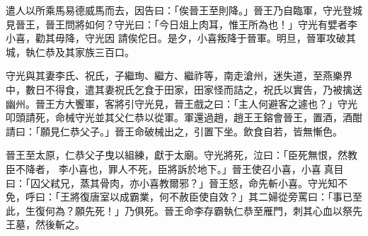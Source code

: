 \begin{pinyinscope}
 遣人以所乘馬易德威馬而去，因告曰：「俟晉王至則降。」晉王乃自臨軍，守光登城見晉王，晉王問將如何？守光曰：「今日俎上肉耳，惟王所為也！」守光有嬖者李小喜，勸其毋降，守光因
 請俟佗日。是夕，小喜叛降于晉軍。明旦，晉軍攻破其城，執仁恭及其家族三百口。



 守光與其妻李氏、祝氏，子繼珣、繼方、繼祚等，南走滄州，迷失道，至燕樂界中，數日不得食，遣其妻祝氏乞食于田家，田家怪而詰之，祝氏以實告，乃被擒送幽州。晉王方大饗軍，客將引守光見，晉王戲之曰：「主人何避客之遽也？」守光叩頭請死，命械守光並其父仁恭以從軍。軍還過趙，趙王王鎔會晉王，置酒，酒酣請曰：「願見仁恭父子。」晉王命破械出之，引置下坐。飲食自若，皆無慚色。



 晉王至太原，仁恭父子曳以組練，獻于太廟。守光將死，泣曰：「臣死無恨，然教臣不降者，
 李小喜也，罪人不死，臣將訴於地下。」晉王使召小喜，小喜真目曰：「囚父弒兄，蒸其骨肉，亦小喜教爾邪？」晉王怒，命先斬小喜。守光知不免，呼曰：「王將復唐室以成霸業，何不赦臣使自效？」其二婦從旁罵曰：「事已至此，生復何為？願先死！」乃俱死。晉王命李存霸執仁恭至雁門，刺其心血以祭先王墓，然後斬之。



\end{pinyinscope}